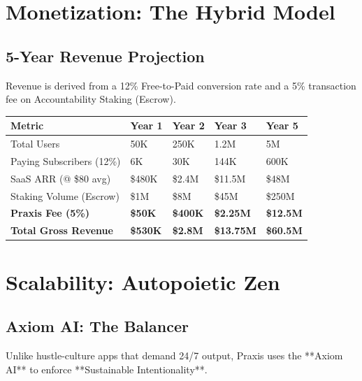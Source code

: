 \documentclass[11pt,a4paper,oneside]{article}
\begin{document}
\section{Monetization: The Hybrid Model}

\subsection{5-Year Revenue Projection}
Revenue is derived from a 12\% Free-to-Paid conversion rate and a 5\% transaction fee on Accountability Staking (Escrow).

\begin{center}
\begin{tabularx}{\linewidth}{l X X X X}
\toprule
\textbf{Metric} & \textbf{Year 1} & \textbf{Year 2} & \textbf{Year 3} & \textbf{Year 5} \\
\midrule
Total Users & 50K & 250K & 1.2M & 5M \\
Paying Subscribers (12\%) & 6K & 30K & 144K & 600K \\
SaaS ARR (@ \$80 avg) & \$480K & \$2.4M & \$11.5M & \$48M \\
Staking Volume (Escrow) & \$1M & \$8M & \$45M & \$250M \\
\textbf{Praxis Fee (5\%)} & \textbf{\$50K} & \textbf{\$400K} & \textbf{\$2.25M} & \textbf{\$12.5M} \\
\midrule
\textbf{Total Gross Revenue} & \textbf{\$530K} & \textbf{\$2.8M} & \textbf{\$13.75M} & \textbf{\$60.5M} \\
\bottomrule
\end{tabularx}
\end{center}

\section{Scalability: Autopoietic Zen}

\subsection{Axiom AI: The Balancer}
Unlike hustle-culture apps that demand 24/7 output, Praxis uses the **Axiom AI** to enforce **Sustainable Intentionality**. 
\end{document}

